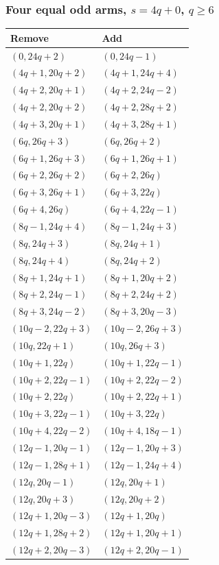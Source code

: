 \subsubsection[Four equal odd arms, s=4q+0, q >= 6]{Four equal odd arms, $s=4q+0$, $q\ge6$}
\label{templates:four-r0}
\begingroup\small
\begin{longtable}{ll}
Remove & Add\\\hline\endhead
$(0,24q+2)$ & $(0,24q-1)$\\
$(4q+1,20q+2)$ & $(4q+1,24q+4)$\\
$(4q+2,20q+1)$ & $(4q+2,24q-2)$\\
$(4q+2,20q+2)$ & $(4q+2,28q+2)$\\
$(4q+3,20q+1)$ & $(4q+3,28q+1)$\\
$(6q,26q+3)$ & $(6q,26q+2)$\\
$(6q+1,26q+3)$ & $(6q+1,26q+1)$\\
$(6q+2,26q+2)$ & $(6q+2,26q)$\\
$(6q+3,26q+1)$ & $(6q+3,22q)$\\
$(6q+4,26q)$ & $(6q+4,22q-1)$\\
$(8q-1,24q+4)$ & $(8q-1,24q+3)$\\
$(8q,24q+3)$ & $(8q,24q+1)$\\
$(8q,24q+4)$ & $(8q,24q+2)$\\
$(8q+1,24q+1)$ & $(8q+1,20q+2)$\\
$(8q+2,24q-1)$ & $(8q+2,24q+2)$\\
$(8q+3,24q-2)$ & $(8q+3,20q-3)$\\
$(10q-2,22q+3)$ & $(10q-2,26q+3)$\\
$(10q,22q+1)$ & $(10q,26q+3)$\\
$(10q+1,22q)$ & $(10q+1,22q-1)$\\
$(10q+2,22q-1)$ & $(10q+2,22q-2)$\\
$(10q+2,22q)$ & $(10q+2,22q+1)$\\
$(10q+3,22q-1)$ & $(10q+3,22q)$\\
$(10q+4,22q-2)$ & $(10q+4,18q-1)$\\
$(12q-1,20q-1)$ & $(12q-1,20q+3)$\\
$(12q-1,28q+1)$ & $(12q-1,24q+4)$\\
$(12q,20q-1)$ & $(12q,20q+1)$\\
$(12q,20q+3)$ & $(12q,20q+2)$\\
$(12q+1,20q-3)$ & $(12q+1,20q)$\\
$(12q+1,28q+2)$ & $(12q+1,20q+1)$\\
$(12q+2,20q-3)$ & $(12q+2,20q-1)$\\

\end{longtable}
